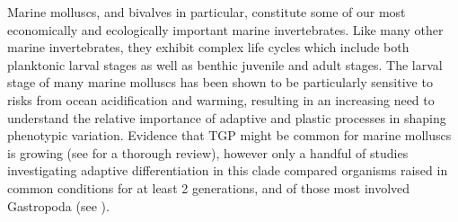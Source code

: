 \documentclass[10pt,letterpaper]{article}
\begin{document}
Marine molluscs, and bivalves in particular, constitute some of our most economically and ecologically important marine invertebrates. Like many other marine invertebrates, they exhibit complex life cycles which include both planktonic larval stages as well as benthic juvenile and adult stages. The larval stage of many marine molluscs has been shown to be particularly sensitive to risks from ocean acidification and warming\cite{Parker2013-xg,Byrne2011-hk}, resulting in an increasing need to understand the relative importance of adaptive and plastic processes in shaping phenotypic variation. Evidence that TGP might be common for marine molluscs is growing (see \cite{Ross2016-en} for a thorough review), however only a handful of studies investigating adaptive differentiation in this clade compared organisms raised in common conditions for at least 2 generations, and of those most involved Gastropoda (see \cite{Kuo2009-co,Palmer1994-nw,Sanford2010-df,Dittman1998-xm,Bible2016-rb}).\par 
\end{document}
